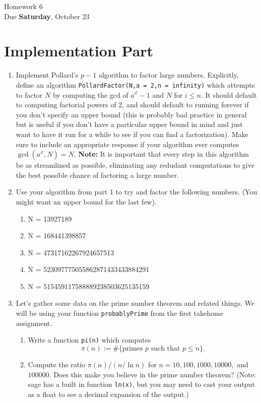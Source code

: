 \documentclass[11pt]{article}
\begin{document}
\begin{center}
\Large {Homework 6}\\
\small {Due \textbf{Saturday}, October 23}
\end{center}
\section*{Implementation Part}
\begin{enumerate}
  \item{
  Implement Pollard's $p-1$ algorithm to factor large numbers.  Explicitly, define an algorithm \verb|PollardFactor(N,a = 2,n = infinity)| which attempts to factor $N$ by computing the gcd of $a^{i!}-1$ and $N$ for $i\le n$.  It should default to computing factorial powers of $2$, and should default to running forever if you don't specify an upper bound (this is probably bad practice in general but is useful if you don't have a particular upper bound in mind and just want to have it run for a while to see if you can find a factorization).  Make sure to include an appropriate response if your algorithm ever computes $\gcd(a^{i!},N)=N$.  \textbf{Note:} It is important that every step in this algorithm be as streamlined as possible, eliminating any redudant computations to give the best possible chance of factoring a large number.
  }
  \item{
  Use your algorithm from part 1 to try and factor the following numbers.  (You might want an upper bound for the last few).
  \begin{enumerate}
    \item{N = 13927189}
    \item{N = 168441398857}
    \item{N = 47317162267924657513}
    \item{N = 523097775055862871433433884291}
    \item{N = 515459117588889238503625135159}
  \end{enumerate}
  }
  \item{
  Let's gather some data on the prime number theorem and related things.  We will be using your function \verb|probablyPrime| from the first takehome assignment.
  \begin{enumerate}
    \item{
    Write a function \verb|pi(n)| which computes
    \[\pi(n):=\#\{\text{primes }p\text{ such that }p\le n\}.\]
    }
    \item{
    Compute the ratio $\pi(n)/(n/\ln n)$ for $n = 10,100,1000,10000,$ and $100000$.  Does this make you believe in the prime number theorem?  (Note: sage has a built in function \verb|ln(x)|, but you may need to cast your output as a float to see a decimal expansion of the output.)
}
\end{enumerate}}
\end{enumerate}
\end{document}
